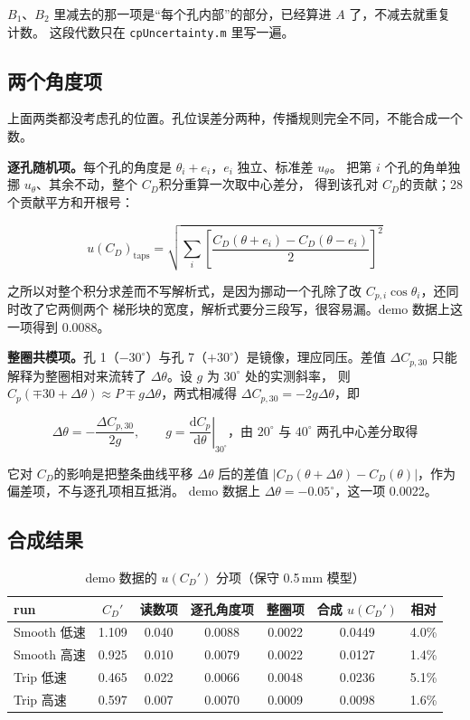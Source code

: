 \documentclass[11pt,a4paper]{ctexart}
\newcommand{\Cp}{\ensuremath{C_p}}
\newcommand{\CD}{\ensuremath{C_D}}
\begin{document}
$B_1$、$B_2$ 里减去的那一项是“每个孔内部”的部分，已经算进 $A$ 了，不减去就重复计数。
这段代数只在 \texttt{cpUncertainty.m} 里写一遍。

\subsection{两个角度项}

上面两类都没考虑孔的位置。孔位误差分两种，传播规则完全不同，不能合成一个数。

\textbf{逐孔随机项。}每个孔的角度是 $\theta_i + e_i$，$e_i$ 独立、标准差 $u_\theta$。
把第 $i$ 个孔的角单独挪 $u_\theta$、其余不动，整个 \CD 积分重算一次取中心差分，
得到该孔对 \CD 的贡献；28 个贡献平方和开根号：

\begin{equation}
u(\CD)_{\text{taps}} = \sqrt{\sum_i \left[\frac{\CD(\theta + e_i) - \CD(\theta - e_i)}{2}\right]^2}
\end{equation}

之所以对整个积分求差而不写解析式，是因为挪动一个孔除了改 $C_{p,i} \cos\theta_i$，还同时改了它两侧两个
梯形块的宽度，解析式要分三段写，很容易漏。demo 数据上这一项得到 0.0088。

\textbf{整圈共模项。}孔 1（$-30^\circ$）与孔 7（$+30^\circ$）是镜像，理应同压。差值 $\Delta C_{p,30}$
只能解释为整圈相对来流转了 $\Delta\theta$。设 $g$ 为 $30^\circ$ 处的实测斜率，
则 $\Cp(\mp 30 + \Delta\theta) \approx P \mp g\Delta\theta$，两式相减得 $\Delta C_{p,30} = -2g\Delta\theta$，即

\begin{equation}
\Delta\theta = -\frac{\Delta C_{p,30}}{2g}, \qquad
g = \left.\frac{\mathrm{d}\Cp}{\mathrm{d}\theta}\right|_{30^\circ}
\text{，由 $20^\circ$ 与 $40^\circ$ 两孔中心差分取得}
\end{equation}

它对 \CD 的影响是把整条曲线平移 $\Delta\theta$ 后的差值
$|\CD(\theta + \Delta\theta) - \CD(\theta)|$，作为偏差项，不与逐孔项相互抵消。
demo 数据上 $\Delta\theta = -0.05^\circ$，这一项 0.0022。

\subsection{合成结果}

\begin{table}[H]
\centering
\caption{demo 数据的 $u(\CD')$ 分项（保守 0.5\,mm 模型）}
\small
\begin{tabular}{@{}l c c c c c c@{}}
\toprule
run & $\CD'$ & 读数项 & 逐孔角度项 & 整圈项 & 合成 $u(\CD')$ & 相对 \\
\midrule
Smooth 低速 & 1.109 & 0.040 & 0.0088 & 0.0022 & 0.0449 & 4.0\% \\
Smooth 高速 & 0.925 & 0.010 & 0.0079 & 0.0022 & 0.0127 & 1.4\% \\
Trip 低速 & 0.465 & 0.022 & 0.0066 & 0.0048 & 0.0236 & 5.1\% \\
Trip 高速 & 0.597 & 0.007 & 0.0070 & 0.0009 & 0.0098 & 1.6\% \\
\bottomrule
\end{tabular}
\end{table}
\end{document}

